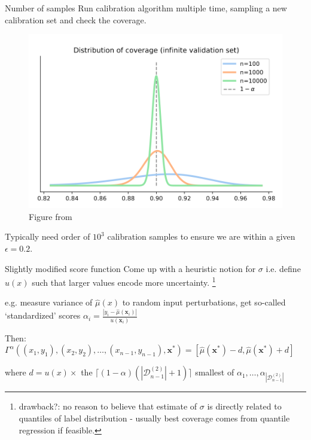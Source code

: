 \documentclass[usenames,dvipsnames]{beamer}
\theoremstyle{definition}
\let\oldcite=\cite
\renewcommand{\cite}[2][]{\textcolor{green}{\oldcite[#1]{#2}}}
\begin{document}
\begin{frame}{Number of samples}
    Run calibration algorithm multiple time, sampling a new calibration set and check the coverage.

    \begin{figure}
        \centering
        \includegraphics[width=0.5\linewidth]{coverage_distribution.png}
        \caption{Figure from \cite{angelopoulos_gentle_2022}}
        \label{fig:cdist}
    \end{figure}


    Typically need order of $10^3$ calibration samples to ensure we are within a given $\epsilon=0.2$.
\end{frame}


\begin{frame}{Slightly modified score function}
    \cite{angelopoulos_gentle_2022} Come up with a heuristic notion for $\sigma$ i.e. define $u(x)$ such that larger values encode more uncertainty. \footnote{drawback?: no reason to believe that estimate of $\sigma$ is directly related to quantiles of label distribution - usually best coverage comes from quantile regression if feasible.}
    
    e.g. measure variance of $\widehat{\mu}(x)$ to random input perturbations, get so-called `standardized' scores $\alpha_i = \frac{|y_i - \widehat{\mu}(\mathbf{x}_i)|}{u(\mathbf{x}_i)}$
    
    Then: 
    $\Gamma^{\alpha}((x_{1}, y_1),(x_{2}, y_2),\ldots,(x_{n-1}, y_{n-1}), \mathbf{x^{\ast}}) = [\widehat{\mu}(\mathbf{x}^*)-d,\widehat{\mu}(\mathbf{x}^*)+d]$

    where $d=u(x)\times$ the $\lceil(1-\alpha)(|\mathcal{D}_{n-1}^{(2)}|+1)\rceil$ smallest of $\alpha_{1},\ldots,\alpha_{|\mathcal{D}_{n-1}^{(2)}|}$
    
\end{frame}
\end{document}
